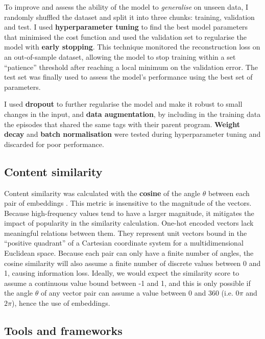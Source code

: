 To improve and assess the ability of the model to \textit{generalise} on unseen data, I randomly shuffled the dataset and split
it into three chunks: training, validation and test. I used \textbf{hyperparameter tuning} to find the best model parameters
that minimised the cost function and used the validation set to regularise the model with \textbf{early stopping}.
This technique monitored the reconstruction loss on an out-of-sample dataset,
allowing the model to stop training within a set ``patience'' threshold after reaching a local minimum on the validation error.
The test set was finally used to assess the model's performance using the best set of parameters.

I used \textbf{dropout} to further regularise the model and make it robust to small changes in the input,
and \textbf{data augmentation}, by including in the training data the episodes that shared the same tags with their
parent program. \textbf{Weight decay} and \textbf{batch normalisation} were tested during hyperparameter tuning and discarded for poor performance.

\subsection{Content similarity}

Content similarity was calculated with the \textbf{cosine} of the angle $\theta$ between each pair of embeddings \cite{GoogleForDevelopers:EmbeddingSimilarity}.
This metric is insensitive to the magnitude of the vectors. Because high-frequency values tend to have a larger magnitude,
it mitigates the impact of popularity in the similarity calculation.
One-hot encoded vectors lack meaningful relations between them.
They represent unit vectors bound in the ``positive quadrant'' of a Cartesian coordinate system for a multidimensional Euclidean space.
Because each pair can only have a finite number of angles,
the cosine similarity will also assume a finite number of discrete values between 0 and 1, causing information
loss. Ideally, we would expect the similarity score to assume a continuous value bound between -1 and 1, and this
is only possible if the angle $\theta$ of any vector pair can assume a value between 0 and 360 (i.e. $0\pi$ and $2\pi$), hence
the use of embeddings.

\subsection{Tools and frameworks}

